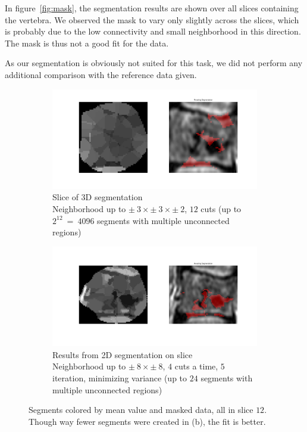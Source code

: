\documentclass{article}
\begin{document}
  In figure~\ref{fig:mask}, the segmentation results are shown over all slices containing the vertebra.
  We observed the mask to vary only slightly across the slices, which is probably due to the low connectivity and small neighborhood in this direction.
  The mask is thus not a good fit for the data.
  
  As our segmentation is obviously not suited for this task, we did not perform any additional comparison with the reference data given.
  
      \begin{figure}[h]
        \centering
        \begin{subfigure}[t]{0.48\linewidth}
          \centering
          \includegraphics[width=\linewidth,trim={5cm 4cm 5cm 1cm},clip]{imgs/vars12}
          \caption{Slice of 3D segmentation\\
            Neighborhood up to $\pm~3 \times \pm~3 \times \pm~2$, $12$ cuts (up to $2^{12}~=~4096$ segments with multiple unconnected regions)
          }
        \end{subfigure}
        \hfill
        \begin{subfigure}[t]{0.48\linewidth}
          \centering
          \includegraphics[width=\linewidth,trim={5cm 2.6cm 5cm 2.4cm},clip]{imgs/vars12-2D}
          \caption{Results from 2D segmentation on slice\\
            Neighborhood up to $\pm~8 \times \pm~8$, $4$ cuts a time, $5$ iteration, minimizing variance (up to $24$ segments with multiple unconnected regions)
          }
        \end{subfigure}
        \caption{\label{fig:2D3D}
          Segments colored by mean value and masked data, all in slice $12$.
          Though way fewer segments were created in (b), the fit is better.}
      \end{figure}
      
\end{document}
